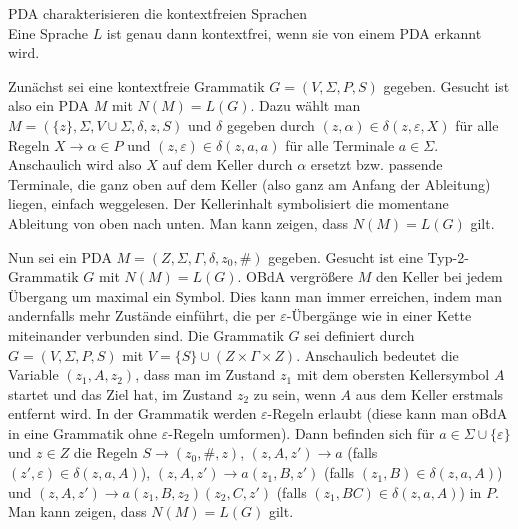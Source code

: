 \linie

\begin{Satz}{PDA charakterisieren die kontextfreien Sprachen}\\
    Eine Sprache $L$ ist genau dann kontextfrei, wenn sie von einem PDA
    erkannt wird.
\end{Satz}

\begin{Beweis}
    Zunächst sei eine kontextfreie Grammatik $G = (V, \Sigma, P, S)$ gegeben.
    Gesucht ist also ein PDA $M$ mit $N(M) = L(G)$.
    Dazu wählt man $M = (\{z\}, \Sigma, V \cup \Sigma, \delta, z, S)$ und
    $\delta$ gegeben durch
    $(z, \alpha) \in \delta(z, \varepsilon, X)$ für alle Regeln
    $X \rightarrow \alpha \in P$ und
    $(z, \varepsilon) \in \delta(z, a, a)$ für alle Terminale $a \in \Sigma$.
    Anschaulich wird also $X$ auf dem Keller durch $\alpha$ ersetzt bzw.
    passende Terminale, die ganz oben auf dem Keller
    (also ganz am Anfang der Ableitung) liegen, einfach weggelesen.
    Der Kellerinhalt symbolisiert die momentane Ableitung von oben nach unten.
    Man kann zeigen, dass $N(M) = L(G)$ gilt.
    
    Nun sei ein PDA $M = (Z, \Sigma, \Gamma, \delta, z_0, \#)$ gegeben.
    Gesucht ist eine Typ-2-Grammatik $G$ mit $N(M) = L(G)$.
    OBdA vergrößere $M$ den Keller bei jedem Übergang um maximal ein Symbol.
    Dies kann man immer erreichen, indem man andernfalls mehr Zustände
    einführt, die per $\varepsilon$-Übergänge wie in einer Kette miteinander
    verbunden sind.
    Die Grammatik $G$ sei definiert durch $G = (V, \Sigma, P, S)$ mit
    $V = \{S\} \cup (Z \times \Gamma \times Z)$.
    Anschaulich bedeutet die Variable $(z_1, A, z_2)$, dass man im Zustand
    $z_1$ mit dem obersten Kellersymbol $A$ startet und das Ziel hat,
    im Zustand $z_2$ zu sein, wenn $A$ aus dem Keller erstmals entfernt wird.
    In der Grammatik werden $\varepsilon$-Regeln erlaubt
    (diese kann man oBdA in eine Grammatik ohne $\varepsilon$-Regeln umformen).
    Dann befinden sich für $a \in \Sigma \cup \{\varepsilon\}$ und
    $z \in Z$ die Regeln
    $S \rightarrow (z_0, \#, z)$,
    $(z, A, z') \rightarrow a$
    (falls $(z', \varepsilon) \in \delta(z, a, A)$),
    $(z, A, z') \rightarrow a (z_1, B, z')$
    (falls $(z_1, B) \in \delta(z, a, A)$) und
    $(z, A, z') \rightarrow a (z_1, B, z_2) (z_2, C, z')$
    (falls $(z_1, BC) \in \delta(z, a, A)$) in $P$.
    Man kann zeigen, dass $N(M) = L(G)$ gilt.
\end{Beweis}

